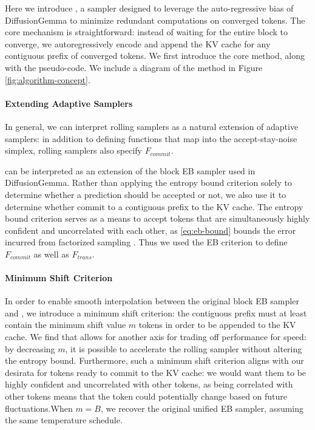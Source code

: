 Here we introduce \algname, a sampler designed to leverage the auto-regressive bias of DiffusionGemma to minimize redundant computations on converged tokens.
The core mechanism is straightforward: instead of waiting for the entire block to converge, we autoregressively encode and append the KV cache for any contiguous prefix of converged tokens.
We first introduce the core method, along with the pseudo-code. 
We include a diagram of the method in Figure \ref{fig:algorithm-concept}. 


\paragraph{Extending Adaptive Samplers}
In general, we can interpret rolling samplers as a natural extension of adaptive samplers: in addition to defining functions that map into the accept-stay-noise simplex, rolling samplers also specify $F_{commit}$.

\algname can be interpreted as an extension of the block EB sampler used in DiffusionGemma.
Rather than applying the entropy bound criterion solely to determine whether a prediction should be accepted or not, we also use it to determine whether commit to a contiguous prefix to the KV cache.
The entropy bound criterion serves as a means to accept tokens that are simultaneously highly confident and uncorrelated with each other, as \eqref{eq:eb-bound} bounds the error incurred from factorized sampling \citep{ben2026accelerated}.
Thus we used the EB criterion to define $F_{commit}$ as well as $F_{trans}$.




\paragraph{Minimum Shift Criterion}
In order to enable smooth interpolation between the original block EB sampler and \algname, we introduce a minimum shift criterion: the contiguous prefix must at least contain the minimum shift value $m$ tokens in order to be appended to the KV cache. We find that allows for another axis for trading off performance for speed: by decreasing $m$, it is possible to accelerate the rolling sampler without altering the entropy bound. 
Furthermore, such a minimum shift criterion aligns with our desirata for tokens ready to commit to the KV cache: we would want them to be highly confident and uncorrelated with other tokens, as being correlated with other tokens means that the token could potentially change based on future fluctuations.When $m=B$, we recover the original unified EB sampler, assuming the same temperature schedule.



